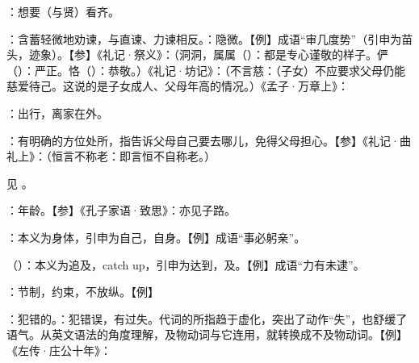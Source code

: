 {
\item {}：想要（与贤）看齐。
}
{}


{
\item {}：含蓄轻微地劝谏，与直谏、力谏相反。：隐微。【例】成语“审几度势”（引申为苗头，迹象）。【参】《礼记·祭义》：（洞洞，属属（）：都是专心谨敬的样子。俨（）：严正。恪（）：恭敬。）《礼记·坊记》：（不言慈：（子女）不应要求父母仍能慈爱待己。这说的是子女成人、父母年高的情况。）《孟子·万章上》：
}
{}


{
\item {}：出行，离家在外。
\item {}：有明确的方位处所，指告诉父母自己要去哪儿，免得父母担心。【参】《礼记·曲礼上》：（恒言不称老：即言恒不自称老。）
}
{}


{
见 。
}
{}


{
\item {}：年龄。【参】《孔子家语·致思》：亦见子路。
}
{}


{
\item {}：本义为身体，引申为自己，自身。【例】成语“事必躬亲”。
\item {}（）：本义为追及，catch up，引申为达到，及。【例】成语“力有未逮”。
}
{}


{
\item {}：节制，约束，不放纵。【例】 

\item {}：犯错的。：犯错误，有过失。代词的所指趋于虚化，突出了动作“失”，也舒缓了语气。从英文语法的角度理解，及物动词与它连用，就转换成不及物动词。【例】 《左传·庄公十年》：
}
{}


